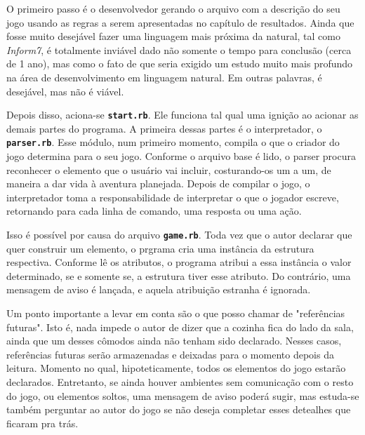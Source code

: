 O primeiro passo é o desenvolvedor gerando o arquivo com a descrição do seu jogo
usando as regras a serem apresentadas no capítulo de resultados. Ainda que fosse
muito desejável fazer uma linguagem mais próxima da natural, tal como
\emph{Inform7}, é totalmente inviável dado não somente o tempo para conclusão
(cerca de 1 ano), mas como o fato de que seria exigido um estudo muito mais
profundo na área de desenvolvimento em linguagem natural. Em outras palavras, é
desejável, mas não é viável.

Depois disso, aciona-se \texttt{\textbf{start.rb}}. Ele funciona tal qual uma
ignição ao acionar as demais partes do programa. A primeira dessas partes é o
interpretador, o \texttt{\textbf{parser.rb}}. Esse módulo, num primeiro momento,
compila o que o criador do jogo determina para o seu jogo. Conforme o arquivo
base é lido, o parser procura reconhecer o elemento que o usuário vai incluir,
costurando-os um a um, de maneira a dar vida à aventura planejada. Depois de
compilar o jogo, o interpretador toma a responsabilidade de interpretar o que o
jogador escreve, retornando para cada linha de comando, uma resposta ou uma ação.

Isso é possível por causa do arquivo \texttt{\textbf{game.rb}}. Toda vez que o
autor declarar que quer construir um elemento, o prgrama cria uma instância da
estrutura respectiva. Conforme lê os atributos, o programa atribui a essa
instância o valor determinado, se e somente se, a estrutura tiver esse atributo.
Do contrário, uma mensagem de aviso é lançada, e aquela atribuição estranha
é ignorada.

Um ponto importante a levar em conta são o que posso chamar de "referências
futuras". Isto é, nada impede o autor de dizer que a cozinha fica do lado da
sala, ainda que um desses cômodos ainda não tenham sido declarado. Nesses casos,
referências futuras serão armazenadas e deixadas para o momento depois da
leitura. Momento no qual, hipoteticamente, todos os elementos do jogo estarão
declarados. Entretanto, se ainda houver ambientes sem comunicação com o resto do
jogo, ou elementos soltos, uma mensagem de aviso poderá sugir, mas estuda-se
também perguntar ao autor do jogo se não deseja completar esses detealhes que
ficaram pra trás.

